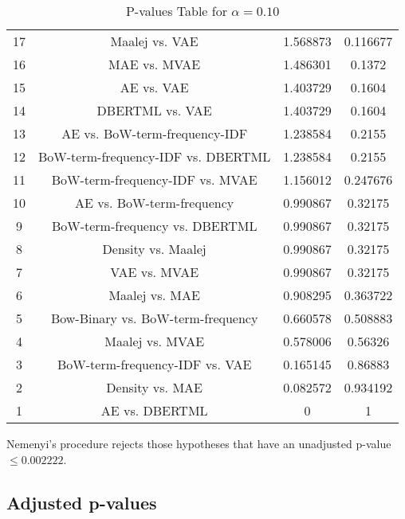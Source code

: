 \documentclass[a4paper,10pt]{article}
\begin{document}
\begin{landscape}
\begin{table}[!htp]
\begin{tabular}{cccc}
17&Maalej vs. VAE&1.568873&0.116677\\
16&MAE vs. MVAE&1.486301&0.1372\\
15&AE vs. VAE&1.403729&0.1604\\
14&DBERTML vs. VAE&1.403729&0.1604\\
13&AE vs. BoW-term-frequency-IDF&1.238584&0.2155\\
12&BoW-term-frequency-IDF vs. DBERTML&1.238584&0.2155\\
11&BoW-term-frequency-IDF vs. MVAE&1.156012&0.247676\\
10&AE vs. BoW-term-frequency&0.990867&0.32175\\
9&BoW-term-frequency vs. DBERTML&0.990867&0.32175\\
8&Density vs. Maalej&0.990867&0.32175\\
7&VAE vs. MVAE&0.990867&0.32175\\
6&Maalej vs. MAE&0.908295&0.363722\\
5&Bow-Binary vs. BoW-term-frequency&0.660578&0.508883\\
4&Maalej vs. MVAE&0.578006&0.56326\\
3&BoW-term-frequency-IDF vs. VAE&0.165145&0.86883\\
2&Density vs. MAE&0.082572&0.934192\\
1&AE vs. DBERTML&0&1\\
\hline
\end{tabular}
\caption{P-values Table for $\alpha=0.10$}
\end{table}Nemenyi's procedure rejects those hypotheses that have an unadjusted p-value $\le0.002222$.

\pagebreak

\subsection{Adjusted p-values}


\end{landscape}
\end{document}
